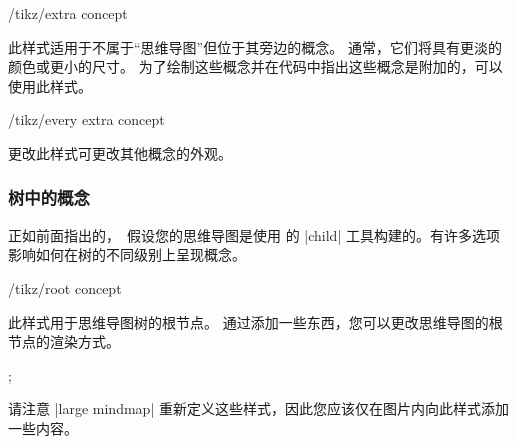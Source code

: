 \begin{stylekey}{/tikz/extra concept}

    此样式适用于不属于``思维导图''但位于其旁边的概念。 通常，它们将具有更淡的颜色或更小的尺寸。 为了绘制这些概念并在代码中指出这些概念是附加的，可以使用此样式。
\begin{codeexample}[preamble={\usetikzlibrary{mindmap}}]
\end{codeexample}
    \begin{stylekey}{/tikz/every extra concept}

        更改此样式可更改其他概念的外观。
    \end{stylekey}
\end{stylekey}


\subsubsection{树中的概念}


正如前面指出的，\tikzname\ 假设您的思维导图是使用 \tikzname 的 |child| 工具构建的。有许多选项影响如何在树的不同级别上呈现概念。

\begin{stylekey}{/tikz/root concept}

    此样式用于思维导图树的根节点。 通过添加一些东西，您可以更改思维导图的根节点的渲染方式。
\begin{codeexample}[preamble={\usetikzlibrary{mindmap}}]
\tikz
  [root concept/.append style={concept color=blue!80,minimum size=3.5cm},
   mindmap]
  ;
\end{codeexample}


    请注意 |large mindmap| 重新定义这些样式，因此您应该仅在图片内向此样式添加一些内容。
\end{stylekey}

